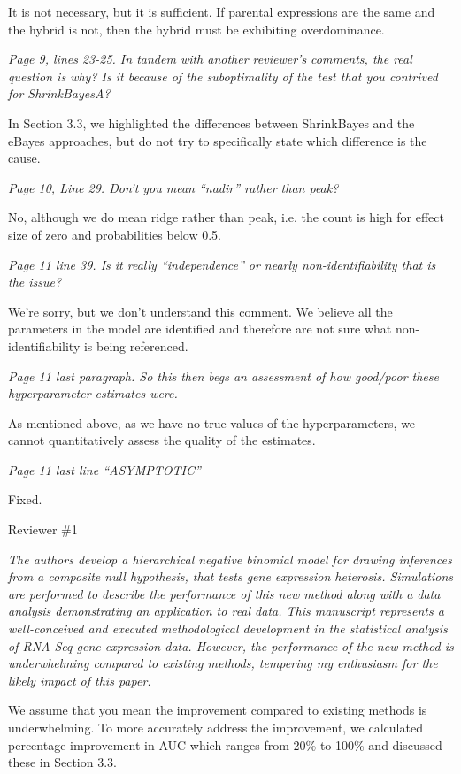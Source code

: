 \documentclass{article}
\newcommand{\comment}[1]{\textit{#1}}
\newcommand{\response}[1]{#1}
\begin{document}
{\response{It is not necessary, but it is sufficient. If parental expressions are the same and the hybrid is not, then the hybrid must be exhibiting overdominance.}

\comment{Page 9, lines 23-25.  In tandem with another reviewer’s comments, the real question is why?  Is it because of the suboptimality of the test that you contrived for ShrinkBayesA?}

\response{In Section 3.3, we highlighted the differences between ShrinkBayes and the eBayes approaches, but do not try to specifically state which difference is the cause.}

\comment{Page 10, Line 29.  Don’t you mean “nadir” rather than peak?}

\response{No, although we do mean ridge rather than peak, i.e. the count is high for effect size of zero and probabilities below 0.5.}

\comment{Page 11 line 39.  Is it really “independence” or nearly non-identifiability that is the issue?}

\response{We're sorry, but we don't understand this comment. We believe all the parameters in the model are identified and therefore are not sure what non-identifiability is being referenced.}

\comment{Page 11 last paragraph.  So this then begs an assessment of how good/poor these hyperparameter estimates were.}

\response{As mentioned above, as we have no true values of the hyperparameters, we cannot quantitatively assess the quality of the estimates.}

\comment{Page 11 last line “ASYMPTOTIC”}}

\response{Fixed.}

Reviewer \#1

\comment{The authors develop a hierarchical negative binomial model for drawing inferences from a composite null hypothesis, that tests gene expression heterosis. Simulations are performed to describe the performance of this new method along with a data analysis demonstrating an application to real data. This manuscript represents a well-conceived and executed methodological development in the statistical analysis of RNA-Seq gene expression data. However, the performance of the new method is underwhelming compared to existing methods, tempering my enthusiasm for the likely impact of this paper.}

\response{We assume that you mean the improvement compared to existing methods is underwhelming. To more accurately address the improvement, we calculated percentage improvement in AUC which ranges from 20\% to 100\% and discussed these in Section 3.3.}
\end{document}
